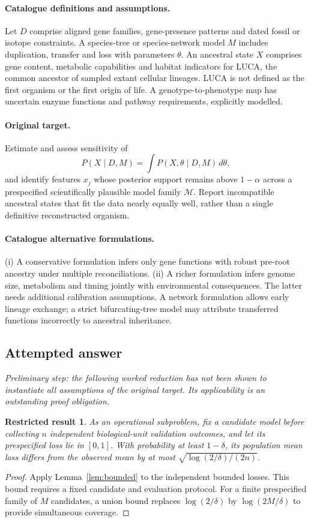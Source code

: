 \documentclass[11pt]{article}
\newtheorem{attemptresult}{Restricted result}[section]
\begin{document}
\paragraph{Catalogue definitions and assumptions.}
Let $D$ comprise aligned gene families, gene-presence patterns and dated fossil or isotope constraints. A species-tree or species-network model $M$ includes duplication, transfer and loss with parameters $\theta$. An ancestral state $X$ comprises gene content, metabolic capabilities and habitat indicators for LUCA, the common ancestor of sampled extant cellular lineages. LUCA is not defined as the first organism or the first origin of life. A genotype-to-phenotype map has uncertain enzyme functions and pathway requirements, explicitly modelled.
\paragraph{Original target.}
Estimate and assess sensitivity of
\[
P(X\mid D,M)=\int P(X,\theta\mid D,M)\,d\theta,
\]
and identify features $x_j$ whose posterior support remains above $1-\alpha$ across a prespecified scientifically plausible model family $\mathcal M$. Report incompatible ancestral states that fit the data nearly equally well, rather than a single definitive reconstructed organism.
\paragraph{Catalogue alternative formulations.}
(i) A conservative formulation infers only gene functions with robust pre-root ancestry under multiple reconciliations. (ii) A richer formulation infers genome size, metabolism and timing jointly with environmental consequences. The latter needs additional calibration assumptions. A network formulation allows early lineage exchange; a strict bifurcating-tree model may attribute transferred functions incorrectly to ancestral inheritance.
\subsection{Attempted answer}
\noindent\emph{Preliminary step: the following worked reduction has not been shown to instantiate all assumptions of the original target. Its applicability is an outstanding proof obligation.}

\begin{attemptresult}
As an operational subproblem, fix a candidate model before collecting $n$ independent biological-unit validation outcomes, and let its prespecified loss lie in $[0,1]$. With probability at least $1-\delta$, its population mean loss differs from the observed mean by at most $\sqrt{\log(2/\delta)/(2n)}$.
\end{attemptresult}
\begin{proof}
Apply Lemma~\ref{lem:bounded} to the independent bounded losses. This bound requires a fixed candidate and evaluation protocol. For a finite prespecified family of $M$ candidates, a union bound replaces $\log(2/\delta)$ by $\log(2M/\delta)$ to provide simultaneous coverage.
\end{proof}
\end{document}
